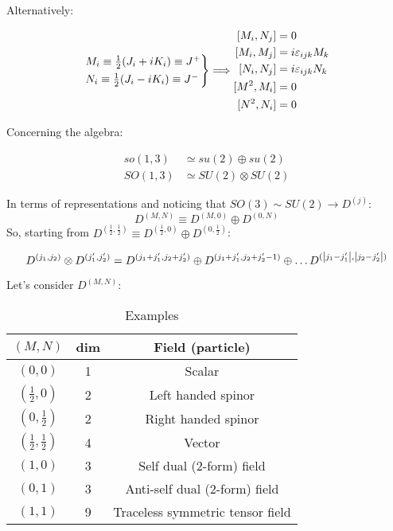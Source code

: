 \documentclass[../../main/main.tex]{subfiles}
\begin{document}
Alternatively:

\begin{equation*}
    \begin{rcases}
        M_i \equiv \frac{1}{2} (J_i + iK_i) \equiv J^+  \\
        N_i \equiv \frac{1}{2} (J_i - iK_i) \equiv J^-
    \end{rcases}
    \Longrightarrow
    \begin{aligned}
        [M_i,N_j] &= 0   \\
        [M_i,M_j] &= i \varepsilon _{ijk} M_k    \\
        [N_i,N_j] &= i \varepsilon _{ijk} N_k    \\
        [M^2,M_i] &= 0   \\
        [N^2,N_i] &= 0
    \end{aligned}
\end{equation*}

Concerning the algebra:

\begin{align*}
    so(1,3) &\simeq su(2) \oplus su(2)   \\
    SO(1,3) &\simeq SU(2) \otimes SU(2)
\end{align*}

In terms of representations and noticing that \( SO(3) \sim SU(2) \longrightarrow D^{(j)} \):
\[
    D^{(M,N)} \equiv D^{(M,0)} \oplus D^{(0,N)}
\]
So, starting from \( D^{(\frac{1}{2},\frac{1}{2})} \equiv D^{(\frac{1}{2},0)} \oplus D^{(0,\frac{1}{2})}\):

\[
    D^{(j_1,j_2)} \otimes D^{(j_1',j_2')} =
    D^{(j_1 + j_1',j_2 + j_2')} \oplus
    D^{(j_1 + j_1',j_2 + j_2' - 1)} \oplus
    \dots
    D^{(\abs{j_1 - j_1'},\abs{j_2 - j_2'})}
\]

Let's consider \( D^{(M,N)} \):

\begin{table}[h]
    \centering
    \begin{tabular}{|c|c|c|}
        \hline
        \( (M,N) \) & dim   &   Field (particle)    \\
        \hline
        \( (0,0) \) & 1     &   Scalar      \\
        \( (\frac{1}{2},0) \) & 2     &   Left handed spinor      \\
        \( (0,\frac{1}{2}) \) & 2     &   Right handed spinor      \\
        \( (\frac{1}{2},\frac{1}{2}) \) & 4     &   Vector      \\
        \( (1,0) \) & 3     &   Self dual (2-form) field      \\
        \( (0,1) \) & 3     &   Anti-self dual (2-form) field      \\
        \( (1,1) \) & 9     &   Traceless symmetric tensor field    \\
        \hline
    \end{tabular}
    \caption{Examples}
    \label{}
\end{table}
\end{document}
